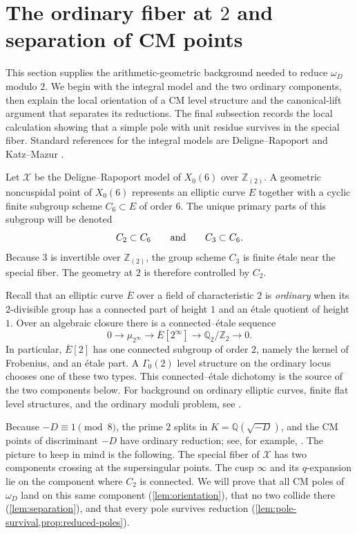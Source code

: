 \documentclass[11pt]{amsart}
\theoremstyle{remark}
\numberwithin{equation}{section}
\newcommand{\Q}{\mathbb Q}
\newcommand{\Z}{\mathbb Z}
\newcommand{\cX}{\mathcal X}
\begin{document}
\section{The ordinary fiber at \texorpdfstring{$2$}{2} and separation of CM points}
\label{sec:geometry}

This section supplies the arithmetic-geometric background needed to reduce
$\omega_D$ modulo $2$.  We begin with the integral model and the two
ordinary components, then explain the local orientation of a CM level
structure and the canonical-lift argument that separates its reductions.
The final subsection records the local calculation showing that a simple
pole with unit residue survives in the special fiber.  Standard references
for the integral models are Deligne--Rapoport \cite[Chapter~VI]{DR} and
Katz--Mazur \cite{KM}.

Let $\cX$ be the Deligne--Rapoport model of $X_0(6)$ over $\Z_{(2)}$.
A geometric noncuspidal point of $X_0(6)$ represents an elliptic curve $E$
together with a cyclic finite subgroup scheme $C_6\subset E$ of order $6$.
The unique primary parts of this subgroup will be denoted
\[
 C_2\subset C_6 \qquad {\text {\rm and}} \qquad C_3\subset C_6.
\]
Because $3$ is invertible over $\Z_{(2)}$, the group scheme $C_3$ is
finite \'etale near the special fiber.  The geometry at $2$ is therefore
controlled by $C_2$.

Recall that an elliptic curve $\overline E$ over a field of characteristic
$2$ is \emph{ordinary} when its $2$-divisible group has a connected part of
height $1$ and an \'etale quotient of height $1$.  Over an algebraic closure
there is a connected--\'etale sequence
\begin{equation}\label{eq:connected-etale}
 0\longrightarrow \mu_{2^\infty}
 \longrightarrow \overline E[2^\infty]
 \longrightarrow \Q_2/\Z_2\longrightarrow0.
\end{equation}
In particular, $\overline E[2]$ has one connected subgroup of order $2$,
namely the kernel of Frobenius, and an \'etale part.  A $\Gamma_0(2)$ level
structure on the ordinary locus chooses one of these two types.  This
connected--\'etale dichotomy is the source of the two components below.
For background on ordinary elliptic curves, finite flat level structures,
and the ordinary moduli problem, see
\cite[Chapters~12--13]{KM}.

Because $-D\equiv1\pmod8$, the prime $2$ splits in
$K=\Q(\sqrt{-D})$, and the CM points of discriminant $-D$ have ordinary
reduction; see, for example, \cite[Section~14]{Cox}.  The picture to keep in mind is the
following.  The special fiber of $\cX$ has two components crossing at the
supersingular points.  The
cusp $\infty$ and its $q$-expansion lie on the component where $C_2$ is
connected.  We will prove that all CM poles of $\omega_D$ land on this same
component (\cref{lem:orientation}), that no two collide there
(\cref{lem:separation}), and that every pole survives reduction
(\cref{lem:pole-survival,prop:reduced-poles}).
\end{document}
